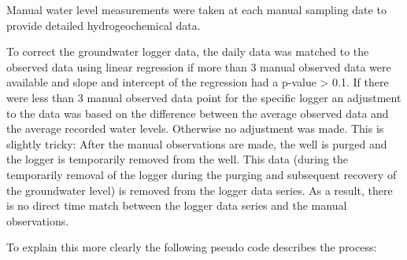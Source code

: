 \documentclass[, manuscript]{copernicus}
\begin{document}
Manual water level measurements were taken at each manual sampling date
to provide detailed hydrogeochemical data.

To correct the groundwater logger data, the daily data was matched to
the observed data using linear regression if more than 3 manual observed
data were available and slope and intercept of the regression had a
p-value \textgreater{} 0.1. If there were less than 3 manual observed
data point for the specific logger an adjustment to the data was based
on the difference between the average observed data and the average
recorded water levels. Otherwise no adjustment was made. This is
slightly tricky: After the manual observations are made, the well is
purged and the logger is temporarily removed from the well. This data
(during the temporarily removal of the logger during the purging and
subsequent recovery of the groundwater level) is removed from the logger
data series. As a result, there is no direct time match between the
logger data series and the manual observations.

To explain this more clearly the following pseudo code describes the
process:
\end{document}
